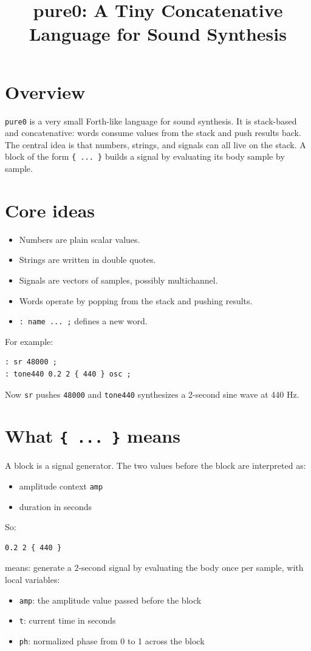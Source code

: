 \documentclass[11pt]{article}
\title{pure0: A Tiny Concatenative Language for Sound Synthesis}
\author{}
\date{}
\begin{document}
\maketitle

\section*{Overview}
\texttt{pure0} is a very small Forth-like language for sound synthesis. It is stack-based and concatenative: words consume values from the stack and push results back. The central idea is that numbers, strings, and signals can all live on the stack. A block of the form \texttt{\{ ... \}} builds a signal by evaluating its body sample by sample.

\section*{Core ideas}
\begin{itemize}
\item Numbers are plain scalar values.
\item Strings are written in double quotes.
\item Signals are vectors of samples, possibly multichannel.
\item Words operate by popping from the stack and pushing results.
\item \texttt{: name ... ;} defines a new word.
\end{itemize}

For example:
\begin{lstlisting}
: sr 48000 ;
: tone440 0.2 2 { 440 } osc ;
\end{lstlisting}

Now \texttt{sr} pushes \texttt{48000} and \texttt{tone440} synthesizes a 2-second sine wave at 440 Hz.

\section*{What \texttt{\{ ... \}} means}
A block is a signal generator. The two values before the block are interpreted as:
\begin{itemize}
\item amplitude context \texttt{amp}
\item duration in seconds
\end{itemize}

So:
\begin{lstlisting}
0.2 2 { 440 }
\end{lstlisting}
means: generate a 2-second signal by evaluating the body once per sample, with local variables:
\begin{itemize}
\item \texttt{amp}: the amplitude value passed before the block
\item \texttt{t}: current time in seconds
\item \texttt{ph}: normalized phase from 0 to 1 across the block
\end{itemize}
\end{document}
